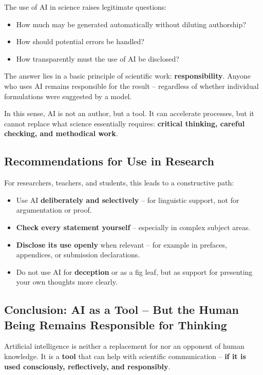 The use of AI in science raises legitimate questions:

\begin{itemize}
	\item How much may be generated automatically
	without diluting authorship?
	\item How should potential errors be handled?
	\item How transparently must the use of AI be disclosed?
\end{itemize}

The answer lies in a basic principle of scientific work:
\textbf{responsibility}.
Anyone who uses AI remains responsible for the result --
regardless of whether individual formulations were suggested by a model.

In this sense, AI is not an author, but a tool.
It can accelerate processes,
but it cannot replace what science essentially requires:
\textbf{critical thinking, careful checking, and methodical work}.

\subsection*{Recommendations for Use in Research}

For researchers, teachers, and students,
this leads to a constructive path:

\begin{itemize}
	\item Use AI \textbf{deliberately and selectively} --
	for linguistic support, not for argumentation or proof.
	\item \textbf{Check every statement yourself} --
	especially in complex subject areas.
	\item \textbf{Disclose its use openly} when relevant --
	for example in prefaces, appendices, or submission declarations.
	\item Do not use AI for \textbf{deception}
	or as a fig leaf,
	but as support for presenting your own thoughts more clearly.
\end{itemize}

\subsection*{Conclusion: AI as a Tool -- But the Human Being Remains Responsible for Thinking}

Artificial intelligence is neither a replacement for
nor an opponent of human knowledge.
It is a \textbf{tool}
that can help with scientific communication --
\textbf{if it is used consciously, reflectively, and responsibly}.


